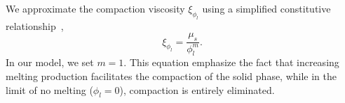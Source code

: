 We approximate the compaction
viscosity $\xi_{\phi_l}$ 
using a simplified constitutive relationship~\cite{PartialMeltinginUpwellingMantleColumn,MagmaDynamicsEnthalpyMethod},
\begin{equation}\label{eq:bulkviscosity}
		  \xi_{\phi_l} = \frac{\mu_s}{\phi_l^m}.
\end{equation}
In our model, we set $m = 1$. 
This equation emphasize the fact that increasing melting production facilitates the compaction of the
solid phase, while in the limit of no melting ($\phi_l = 0$), 
compaction is entirely eliminated.



